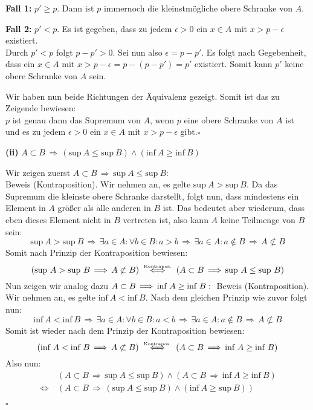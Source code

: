 \documentclass[a4paper,graphics,11pt]{article}
\newcommand{\up}[2]{\mathrel{\overset{\makebox[0pt]{\mbox{\normalfont\tiny #2}}}{#1}}}
\begin{document}
\textbf{Fall 1:} $p' \geq p$. Dann ist $p$ immernoch die kleinstmögliche obere Schranke von $A$.

\textbf{Fall 2:} $p' < p$. Es ist gegeben, dass zu jedem $\epsilon > 0$ ein $x\in A$ mit
$x > p-\epsilon$ existiert.\\
Durch $p'<p$ folgt $p-p' > 0$. Sei nun also $\epsilon = p-p'$.
Es folgt nach Gegebenheit, dass ein $x \in A$ mit $x > p-\epsilon = p-(p-p') = p'$
existiert. Somit kann $p'$ keine obere Schranke von $A$ sein.

Wir haben nun beide Richtungen der Äquivalenz gezeigt.
Somit ist das zu Zeigende bewiesen:\\
$p$ ist genau dann das Supremum von $A$, wenn $p$ eine obere Schranke von $A$ ist und es
zu jedem $\epsilon > 0$ ein $x \in A$ mit $x>p-\epsilon$ gibt.\hfill $\square$

\textbf{(ii)} $A \subset B \,\Longrightarrow\, (\text{sup}\ A \leq \text{sup}\ B) \land
(\text{inf}\ A \geq \text{inf}\ B)$

Wir zeigen zuerst $A \subset B \,\Longrightarrow\, \text{sup}\ A \leq \text{sup}\ B$:\\
Beweis (Kontraposition). Wir nehmen an, es gelte $\text{sup}\ A > \text{sup}\ B$.
Da das Supremum die kleinste obere Schranke darstellt, folgt nun, dass mindestens ein
Element in $A$ größer als alle anderen in $B$ ist. Das bedeutet aber wiederum, dass eben dieses Element nicht in $B$ vertreten ist, also kann $A$ keine Teilmenge von $B$ sein:
$$
    \text{sup}\ A > \text{sup}\ B \,\Longrightarrow\,
    \exists a \in A\colon \forall b \in B \colon a>b \,\Longrightarrow\,
    \exists a \in A \colon a \notin B \,\Longrightarrow\,
    A \not\subset B
$$
Somit nach Prinzip der Kontraposition bewiesen:
$$
    (\text{sup}\ A > \text{sup}\ B \,\Longrightarrow\, A \not\subset B)
    \up{\quad\Longleftrightarrow\quad}{Kontrapos.}(A \subset B \,\Longrightarrow\, \text{sup}\ A \leq \text{sup}\ B)
$$
Nun zeigen wir analog dazu $A \subset B \,\Longrightarrow\, \text{inf}\ A \geq \text{inf}\ B:\\$
Beweis (Kontraposition). Wir nehmen an, es gelte $\text{inf}\ A < \text{inf}\ B$. Nach dem
gleichen Prinzip wie zuvor folgt nun:
$$
     \text{inf}\ A < \text{inf}\ B \,\Longrightarrow\,
    \exists a \in A\colon \forall b \in B \colon a<b \,\Longrightarrow\,
    \exists a \in A \colon a \notin B \,\Longrightarrow\,
    A \not\subset B
$$
Somit ist wieder nach dem Prinzip der Kontraposition bewiesen:
$$
    (\text{inf}\ A < \text{inf}\ B \,\Longrightarrow\, A \not\subset B)
    \up{\quad\Longleftrightarrow\quad}{Kontrapos.}(A \subset B \,\Longrightarrow\, \text{inf}\ A \geq \text{inf}\ B)
$$
Also nun:
\begin{align*}
    &(A \subset B \,\Longrightarrow\, \text{sup}\ A \leq \text{sup}\ B) \land
    (A \subset B \,\Longrightarrow\, \text{inf}\ A \geq \text{inf}\ B)\\
    \,\Longleftrightarrow\ &(A \subset B \,\Longrightarrow\,
        (\text{sup}\ A \leq \text{sup}\ B) \land
        (\text{inf}\ A \geq \text{sup}\ B)
    )
\end{align*}
\strut\hfill$\square$
\end{document}
